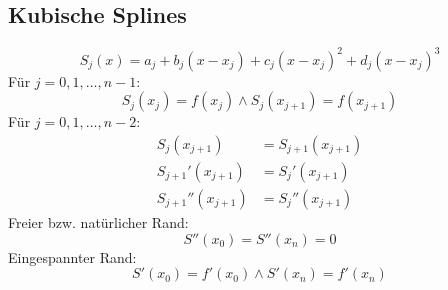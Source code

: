 \documentclass[fs, footer]{latex4ei}
\begin{document}
\begin{multicols*}{4}
{\subsection{Kubische Splines}
\begin{equation*}
	S_j(x) = a_j + b_j (x-x_j) + c_j (x-x_j)^2 + d_j (x-x_j)^3
\end{equation*}
Für $j=0,1,\ldots,n-1$:
\begin{equation*}
	S_j(x_j) = f(x_j) \wedge S_j(x_{j+1}) = f(x_{j+1})
\end{equation*}
Für $j=0,1,\ldots,n-2$:
\begin{align*}
	S_j(x_{j+1}) &= S_{j+1}(x_{j+1})\\
	S_{j+1}'(x_{j+1}) &= S_j'(x_{j+1})\\
	S_{j+1}''(x_{j+1}) &= S_j''(x_{j+1})
\end{align*}
Freier bzw. natürlicher Rand:
\begin{equation*}
	S''(x_0) = S''(x_n) = 0
\end{equation*}
Eingespannter Rand:
\begin{equation*}
	S'(x_0) = f'(x_0) \wedge S'(x_n) = f'(x_n)
\end{equation*}
}


\end{multicols*}
\end{document}
